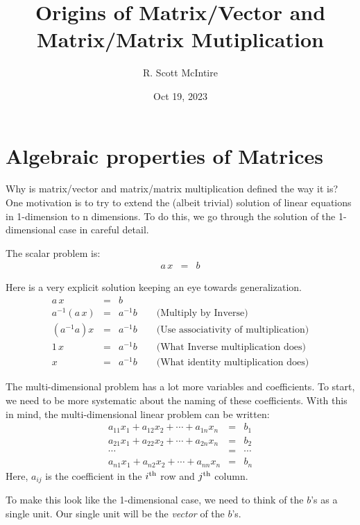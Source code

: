 \documentclass{article}
\title{Origins of Matrix/Vector and Matrix/Matrix Mutiplication}
\author{R. Scott McIntire}
\date{Oct 19, 2023}
\begin{document}
\maketitle


\section{Algebraic properties of Matrices}
Why is matrix/vector and matrix/matrix multiplication defined the way it is?
One motivation is to try to extend the (albeit trivial) solution of linear
equations in 1-dimension to n dimensions. To do this, we go through the solution
of the 1-dimensional case in careful detail.

The scalar problem is:
\begin{eqnarray}
  a \, x & = & b \label{scalar-problem}
\end{eqnarray}

Here is a very explicit solution keeping an eye towards generalization.
\begin{eqnarray}
  a \, x & = & b \\
  a^{-1} ( a \, x ) & = & a^{-1} b \quad \quad \text{(Multiply by Inverse)} \label{inv} \\
  (a^{-1} a) x & = & a^{-1} b \quad \quad \text{(Use associativity of multiplication)} \label{assoc} \\
  1 \, x & = & a^{-1} b \quad \quad \text{(What Inverse multiplication does)} \label{inv-mult} \\
  x & = & a^{-1} b \quad \quad \text{(What identity multiplication does)} \label{identity}
\end{eqnarray}

The multi-dimensional problem has a lot more variables and coefficients.
To start, we need to be more systematic about the naming of these coefficients.
With this in mind, the multi-dimensional linear problem can be written:
\begin{eqnarray*}
  a_{11} x_1 + a_{12} x_2 + \cdots + a_{1n} x_n & = & b_1 \\
  a_{21} x_1 + a_{22} x_2 + \cdots + a_{2n} x_n & = & b_2 \\
  \cdots & = & \cdots \\
  a_{n1} x_1 + a_{n2} x_2 + \cdots + a_{nn} x_n & = & b_n 
\end{eqnarray*}
Here, $a_{ij}$ is the coefficient in the $i^{\rm th}$ row and $j^{\rm th}$ column.


To make this look like the 1-dimensional case, we need to think of the $b$'s as
a single unit. Our single unit will be the {\em vector\/} of the $b$'s.
\end{document}
